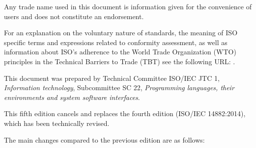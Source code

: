 Any trade name used in this document is information given for the convenience
of users and does not constitute an endorsement.

For an explanation on
the voluntary nature of standards,
the meaning of ISO specific terms and expressions related
to conformity assessment, as well as information about ISO's adherence
to the World Trade Organization (WTO) principles
in the Technical Barriers to Trade (TBT) see the following URL:
\href{http://www.iso.org/iso/foreword.html}{}.

This document was prepared by
Technical Committee ISO/IEC JTC 1, \textit{Information technology},
Subcommittee SC 22, \textit{Programming languages, their environments and system software interfaces}.

This fifth edition cancels and replaces the fourth edition
(ISO/IEC 14882:2014), which has been technically revised.

The main changes compared to the previous edition are as follows:

